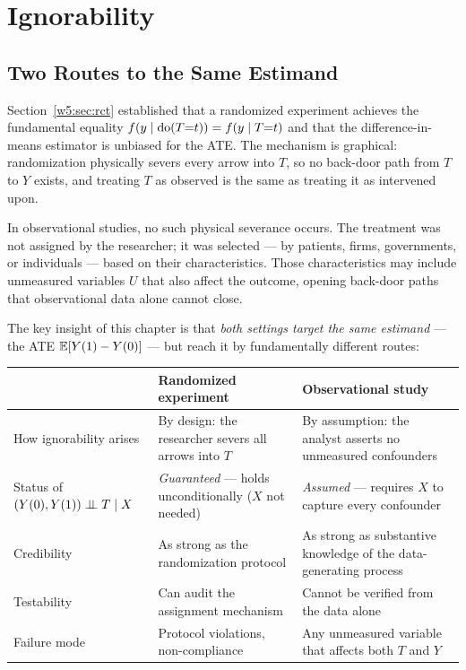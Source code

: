 \documentclass[master.tex]{subfiles}
\begin{document}
\section{Ignorability}
\label{w5:sec:ignorability}

\subsection{Two Routes to the Same Estimand}

Section~\ref{w5:sec:rct} established that a randomized experiment achieves the
fundamental equality $f(y \mid \mathrm{do}(T{=}t)) = f(y \mid T{=}t)$ and
that the difference-in-means estimator is unbiased for the ATE.  The
mechanism is graphical: randomization physically severs every arrow into
$T$, so no back-door path from $T$ to $Y$ exists, and treating $T$ as
observed is the same as treating it as intervened upon.

In observational studies, no such physical severance occurs.  The
treatment was not assigned by the researcher; it was selected --- by
patients, firms, governments, or individuals --- based on their
characteristics.  Those characteristics may include unmeasured variables
$U$ that also affect the outcome, opening back-door paths that
observational data alone cannot close.

The key insight of this chapter is that \emph{both settings target the
same estimand} --- the ATE $\mathbb{E}[Y(1) - Y(0)]$ --- but reach it by
fundamentally different routes:

\begin{tcolorbox}[defstyle, title={Two Routes to Ignorability}]
\renewcommand{\arraystretch}{1.6}
\begin{tabular}{p{3.0cm} p{4.6cm} p{4.6cm}}
\toprule
  & \textbf{Randomized experiment}
  & \textbf{Observational study} \\
\midrule
How ignorability arises
  & By design: the researcher severs all arrows into $T$
  & By assumption: the analyst asserts no unmeasured confounders \\
Status of $(Y(0),Y(1)) \perp\!\!\!\perp T \mid X$
  & \emph{Guaranteed} --- holds unconditionally ($X$ not needed)
  & \emph{Assumed} --- requires $X$ to capture every confounder \\
Credibility
  & As strong as the randomization protocol
  & As strong as substantive knowledge of the data-generating process \\
Testability
  & Can audit the assignment mechanism
  & Cannot be verified from the data alone \\
Failure mode
  & Protocol violations, non-compliance
  & Any unmeasured variable that affects both $T$ and $Y$ \\
\bottomrule
\end{tabular}
\renewcommand{\arraystretch}{1}
\end{tcolorbox}
\end{document}
